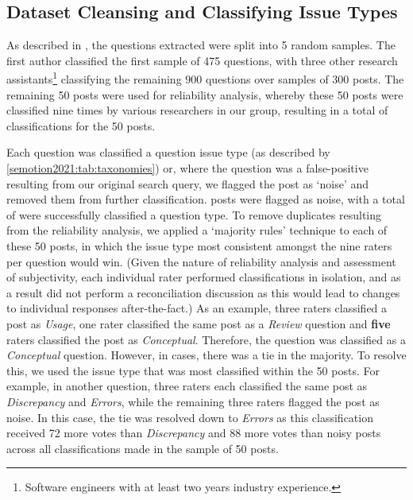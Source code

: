 \subsection{Dataset Cleansing and Classifying Issue Types}
\label{semotion2021:ssec:method:filtering:classification}

As described in \citep{Cummaudo:2020icse}, the \SEMNumTotalPostsFromSO{} questions extracted were split into 5 random samples. The first author classified the first sample of  475 questions, with three other research assistants\footnote{Software engineers with at least two years industry experience.} classifying the remaining 900 questions over samples of 300 posts. The remaining 50 posts were used for reliability analysis, whereby these 50 posts were classified nine times by various researchers in our group, resulting in a total of \SEMNumClassificationsFromBeyerIRRAnalysis{} classifications for the 50 posts.

Each question was classified a question issue type (as described by \cref{semotion2021:tab:taxonomies}) or, where the question was a false-positive resulting from our original search query, we flagged the post as `noise' and removed them from further classification. \SEMNumNoisyPosts{} posts were flagged as noise, with a total of \SEMNumTotalNonNoisePosts{} were successfully classified a question type. To remove duplicates resulting from the reliability analysis, we applied a `majority rules' technique to each of these 50 posts, in which the issue type most consistent amongst the nine raters per question would win. (Given the nature of reliability analysis and assessment of subjectivity, each individual rater performed classifications in isolation, and as a result did not perform a reconciliation discussion as this would lead to changes to individual responses after-the-fact.) As an example, three raters classified a post as \textit{ Usage}, one rater classified the same post as a \textit{Review} question and \textbf{five} raters classified the post as \textit{Conceptual}. Therefore, the question was classified as a \textit{Conceptual} question. However, in \SEMNumIRRPostsTiedMajority{} cases, there was a tie in the majority. To resolve this, we used the issue type that was most classified within the 50 posts. For example, in another question, three raters each classified the same post as \textit{Discrepancy} and \textit{Errors}, while the remaining three raters flagged the post as noise. In this case, the tie was resolved down to \textit{Errors} as this classification received 72 more votes than \textit{Discrepancy} and 88 more votes than noisy posts across all classifications made in the sample of 50 posts. 

